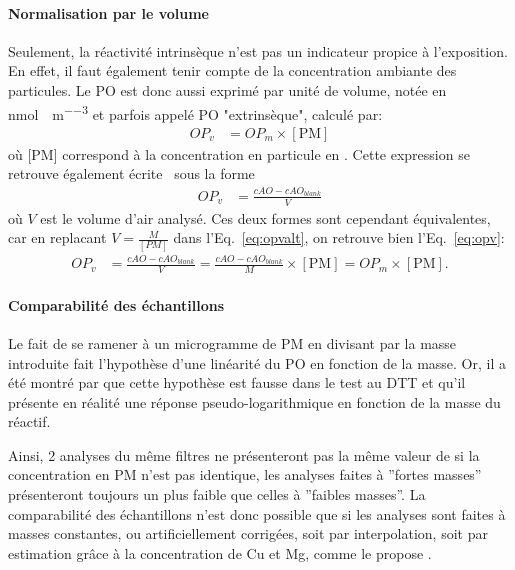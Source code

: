 \paragraph{Normalisation par le volume}%
\label{par:normalisation_par_le_volume}

Seulement, la réactivité intrinsèque n'est pas un indicateur propice à l'exposition. En
effet, il faut également tenir compte de la concentration ambiante des particules. Le PO
est donc aussi exprimé par unité de volume, notée \OPv{} en
\si{\nmol\per\min\per\cubic\meter} et parfois appelé PO "extrinsèque", calculé par:
\begin{align}
    \label{eq:opv}
    OP_v &= OP_m \times [\text{PM}]
\end{align}
où [PM] correspond à la concentration en particule en \si{\ugm}. Cette expression se
retrouve également écrite~\autocite{fangSemiautomated2015} sous la forme
\begin{align}
    \label{eq:opvalt}
    OP_v &= \frac{cAO - cAO_{blank}}{V}
\end{align}
où $V$ est le volume d'air analysé. Ces deux formes sont cependant équivalentes, car en
replacant $V = \frac{M}{[PM]}$ dans l'Eq.~\ref{eq:opvalt}, on retrouve bien
l'Eq.~\ref{eq:opv}:
\begin{align}
    \label{eq:opvopvalt}
    OP_v &= \frac{cAO -cAO_{blank}}{V} = \frac{cAO -cAO_{blank}}{M}\times [\text{PM}] = OP_m \times [\text{PM}].
\end{align}

\paragraph{Comparabilité des échantillons}%
\label{par:comparabilité_des_échantillons}

Le fait de se ramener à un microgramme de PM en divisant par la masse introduite fait
l'hypothèse d'une linéarité du PO en fonction de la masse. Or, il a été montré par
\textcite{charrierDithiothreitol2012,charrierBias2016,calasComparison2018} que cette
hypothèse est fausse dans le test au DTT et qu'il présente en réalité une réponse
pseudo-logarithmique en fonction de la masse du réactif.

Ainsi, 2 analyses du même filtres ne présenteront pas la même valeur de \PODTTm{} si la
concentration en PM n'est pas identique, les analyses faites à ''fortes masses''
présenteront toujours un \PODTTm{} plus faible que celles à ''faibles masses''.
La comparabilité des échantillons n'est donc possible que si les analyses sont faites à
masses constantes, ou artificiellement corrigées, soit par interpolation, soit par
estimation grâce à la concentration de Cu et Mg, comme le propose
\textcite{charrierBias2016}.

